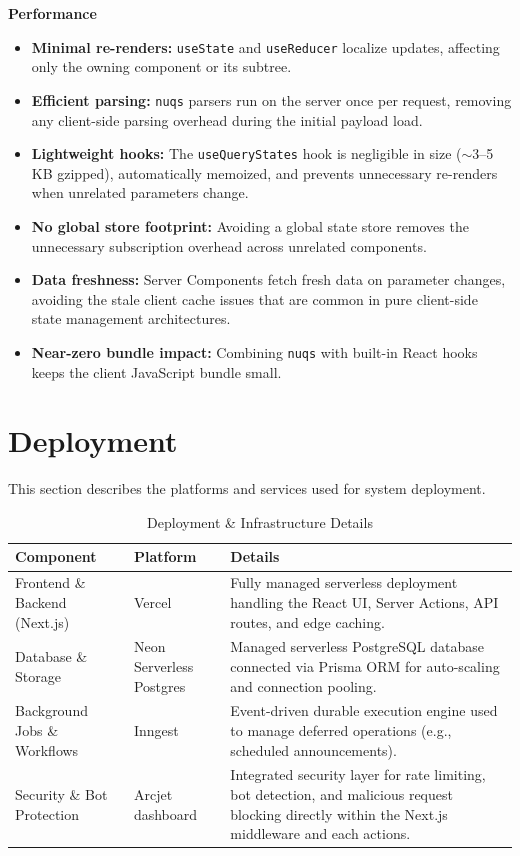 \textbf{Performance}
\begin{itemize}
    \item \textbf{Minimal re-renders:} \texttt{useState} and \texttt{useReducer} localize updates, affecting only the owning component or its subtree.
    \item \textbf{Efficient parsing:} \texttt{nuqs} parsers run on the server once per request, removing any client-side parsing overhead during the initial payload load.
    \item \textbf{Lightweight hooks:} The \texttt{useQueryStates} hook is negligible in size ($\sim$3--5 KB gzipped), automatically memoized, and prevents unnecessary re-renders when unrelated parameters change.
    \item \textbf{No global store footprint:} Avoiding a global state store removes the unnecessary subscription overhead across unrelated components.
    \item \textbf{Data freshness:} Server Components fetch fresh data on parameter changes, avoiding the stale client cache issues that are common in pure client-side state management architectures.
    \item \textbf{Near-zero bundle impact:} Combining \texttt{nuqs} with built-in React hooks keeps the client JavaScript bundle small.
\end{itemize}



\section{Deployment}

This section describes the platforms and services used for system deployment.

\begin{table}[h]
\centering
\renewcommand{\arraystretch}{1.5}
\caption{Deployment \& Infrastructure Details}
\begin{tabularx}{\textwidth}{|p{3.5cm}|p{3cm}|X|}
\hline
\textbf{Component} & \textbf{Platform} & \textbf{Details} \\
\hline
Frontend \& Backend (Next.js) & Vercel & Fully managed serverless deployment handling the React UI, Server Actions, API routes, and edge caching. \\
\hline
Database \& Storage & Neon Serverless Postgres & Managed serverless PostgreSQL database connected via Prisma ORM for auto-scaling and connection pooling. \\
\hline
Background Jobs \& Workflows & Inngest & Event-driven durable execution engine used to manage deferred operations (e.g., scheduled announcements). \\
\hline
Security \& Bot Protection & Arcjet dashboard & Integrated security layer for rate limiting, bot detection, and malicious request blocking directly within the Next.js middleware and each actions. \\
\hline
\end{tabularx}
\end{table}



